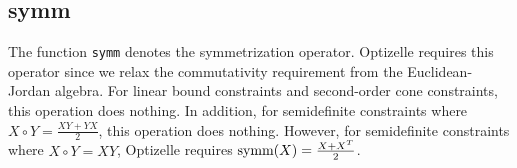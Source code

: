 \documentclass{report}
\begin{document}
\subsection{symm}

        The function \texttt{symm} denotes the symmetrization operator.  Optizelle requires this operator since we relax the commutativity requirement from the Euclidean-Jordan algebra.  For linear bound constraints and second-order cone constraints, this operation does nothing.  In addition, for semidefinite constraints where $X\circ Y=\frac{XY+YX}{2}$, this operation does nothing.  However, for semidefinite constraints where $X\circ Y=XY$, Optizelle requires $\textnormal{symm}(X)=\frac{X+X^T}{2}$.

\clearpage
{}
\printindex
\end{document}
